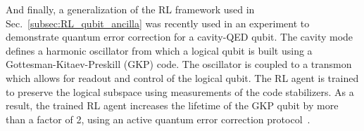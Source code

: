 






And finally, a generalization of the RL framework used in Sec.~\ref{subsec:RL_qubit_ancilla} was recently used in an experiment to demonstrate quantum error correction for a cavity-QED qubit. The cavity mode defines a harmonic oscillator from which a logical qubit is built using a Gottesman-Kitaev-Preskill (GKP) code. The oscillator is coupled to a transmon which allows for readout and control of the logical qubit. The RL agent is trained to preserve the logical subspace using measurements of the code stabilizers. As a result, the trained RL agent increases the lifetime of the GKP qubit by more than a factor of 2, using an active quantum error correction protocol~\cite{sivak2023real}.


